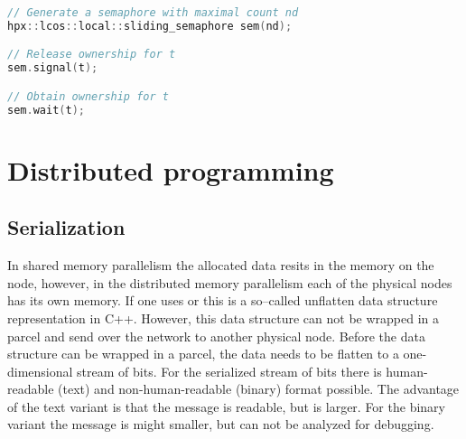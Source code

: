 \begin{lstlisting}[language=c++,caption={HPX's semaphores.\label{code:hpx:semaphore}},float,floatplacement=htb]
// Generate a semaphore with maximal count nd
hpx::lcos::local::sliding_semaphore sem(nd);

// Release ownership for t
sem.signal(t);

// Obtain ownership for t
sem.wait(t);
\end{lstlisting}


\section{Distributed programming}
\label{sec:hpx::distributed}

\subsection{Serialization}
In shared memory parallelism the allocated data resits in the memory on the node, however, in the distributed memory parallelism each of the physical nodes has its own memory. If one uses  or  this is a so--called unflatten data structure representation in C++. However, this data structure can not be wrapped in a parcel and send over the network to another physical node. Before the data structure can be wrapped in a parcel, the data needs to be flatten to a one-dimensional stream of bits. For the serialized stream of bits there is human-readable (text) and non-human-readable (binary) format possible. The advantage of the text variant is that the message is readable, but is larger. For the binary variant the message is might smaller, but can not be analyzed for debugging.\\


